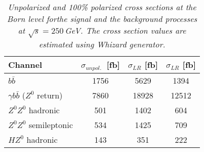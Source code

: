         \begin{table}[H]
        \begin{center}
        \begin{tabular}{l c c c}
        \hline
	Channel & $\sigma_{unpol.}$\ [fb] & $\sigma_{LR}$ [fb] &  $\sigma_{LR}$ [fb] \\
	\hline
	$b\bar{b}$ & 1756 & 5629 & 1394 \\
	\hline
	$\gamma b\bar{b}$ ($Z^0$ return) & 7860 & 18928 & 12512 \\
	$Z^0Z^0$ hadronic &501 & 1402 & 604 \\
	$Z^0Z^0$ semileptonic  &534 & 1425 & 709\\
	$HZ^0$ hadronic  &143 & 351 & 222 \\
        \hline
        \end{tabular}
        \end{center}
        \caption{\sl Unpolarized and 100\% polarized cross sections at the Born level forthe  signal and the background processes at $\sqrt{s}=250$\,GeV. The cross section values are estimated using Whizard generator.}
        \label{table:bbbarsigma}
        \end{table}
